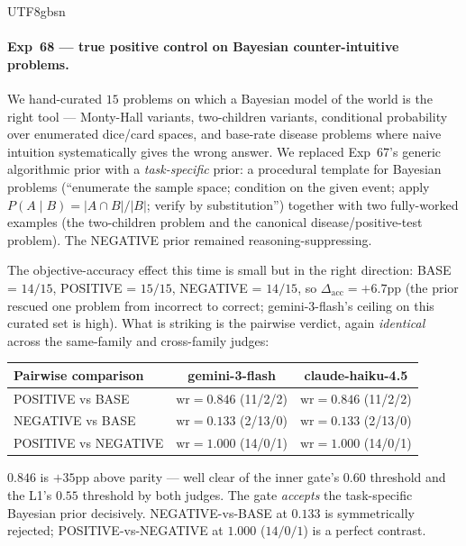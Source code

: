 \documentclass{article}
\begin{document}
\begin{CJK*}{UTF8}{gbsn}
\paragraph{Exp~68 — true positive control on Bayesian
counter-intuitive problems.} We hand-curated \(15\) problems on
which a Bayesian model of the world is the right tool ---
Monty-Hall variants, two-children variants, conditional
probability over enumerated dice/card spaces, and base-rate
disease problems where naive intuition systematically gives the
wrong answer. We replaced Exp~67's generic algorithmic prior
with a \emph{task-specific} prior: a procedural template for
Bayesian problems (``enumerate the sample space; condition on
the given event; apply
\(P(A \mid B) = |A \cap B|/|B|\); verify by substitution'')
together with two fully-worked examples (the two-children
problem and the canonical disease/positive-test problem). The
NEGATIVE prior remained reasoning-suppressing.

The objective-accuracy effect this time is small but in the
right direction: BASE = \(14/15\), POSITIVE = \(15/15\),
NEGATIVE = \(14/15\), so \(\Delta_{\mathrm{acc}} = +6.7\)pp (the
prior rescued one problem from incorrect to correct; gemini-3-flash's
ceiling on this curated set is high). What is striking is the
pairwise verdict, again \emph{identical} across the same-family
and cross-family judges:

\begin{center}\small
\begin{tabular}{lcc}
\toprule
Pairwise comparison & gemini-3-flash & claude-haiku-4.5 \\
\midrule
POSITIVE vs BASE  & \(\mathrm{wr}=\mathbf{0.846}\) (11/2/2)  & \(\mathrm{wr}=\mathbf{0.846}\) (11/2/2) \\
NEGATIVE vs BASE  & \(\mathrm{wr}=0.133\) (2/13/0)           & \(\mathrm{wr}=0.133\) (2/13/0) \\
POSITIVE vs NEGATIVE & \(\mathrm{wr}=1.000\) (14/0/1)        & \(\mathrm{wr}=1.000\) (14/0/1) \\
\bottomrule
\end{tabular}
\end{center}

\noindent \(\mathbf{0.846}\) is \(+35\)pp above parity --- well
clear of the inner gate's \(0.60\) threshold and the L1's
\(0.55\) threshold by both judges. The gate \emph{accepts} the
task-specific Bayesian prior decisively. NEGATIVE-vs-BASE at
\(0.133\) is symmetrically rejected; POSITIVE-vs-NEGATIVE at
\(1.000\) (\(14/0/1\)) is a perfect contrast.


\end{CJK*}
\end{document}
